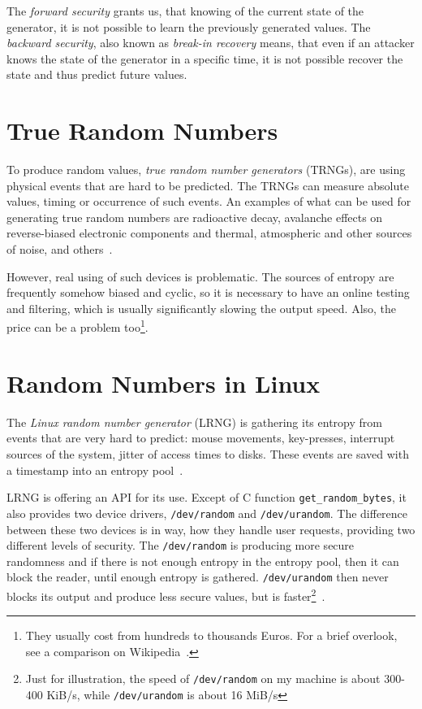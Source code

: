 \par{
The {\em forward security} grants us, that knowing of the current state 
of the generator, it is not possible to learn the previously generated values. 
The {\em backward security}, also known as {\em break-in recovery}  means, 
that even if an attacker knows the state of the generator in a specific time, 
it is not possible recover the state and thus predict future values.
}
\section{True Random Numbers}
\par{
To produce random values, {\em true random number generators} (TRNGs), 
are using physical events that are hard to be predicted. The TRNGs 
can measure absolute values, timing or occurrence of such events.
An examples of what can be used for generating true random numbers 
are radioactive decay, avalanche effects on reverse-biased electronic 
components and thermal, atmospheric and other sources of noise, 
and others~\cite[p.~6]{AnalysisOfEntropyLevels}.
}

\par{
However, real using of such devices is problematic. The sources of entropy are 
frequently somehow biased and cyclic, so it is necessary to have an online 
testing and filtering, which is usually significantly slowing the output speed. 
Also, the price can be a problem too\footnote{They usually cost from hundreds 
to thousands Euros. For a brief overlook, see a comparison 
on Wikipedia~\cite{HWRNGComparison}.}.
}

\section{Random Numbers in Linux}\label{sec:randomNumbers:linux}
\par{
The {\em Linux random number generator} (LRNG) is gathering its entropy 
from events that are very hard to predict: mouse movements, key-presses, 
interrupt sources of the system, jitter of access times to disks. 
These events are saved with a timestamp into an entropy 
pool~\cite{AnalysisOfLinuxRNG}.
}

\par{
LRNG is offering an API for its use. Except of C function 
{\tt get\_random\_bytes}, it also provides two device drivers, {\tt /dev/random} 
and {\tt /dev/urandom}. The difference between these two devices is in way, 
how they handle user requests, providing two different levels of security. 
The {\tt /dev/random} is producing more secure randomness and if there 
is not enough entropy in the entropy pool, then it can block the reader, 
until enough entropy is gathered. {\tt /dev/urandom} then never blocks its output
 and produce less secure values, but is faster\footnote{Just for illustration, 
 the speed of {\tt /dev/random} on my machine is about 300-400 KiB/s, 
 while {\tt /dev/urandom} is about 16 MiB/s}~\cite[chapter~1]{AnalysisOfLinuxRNG}. 
}

